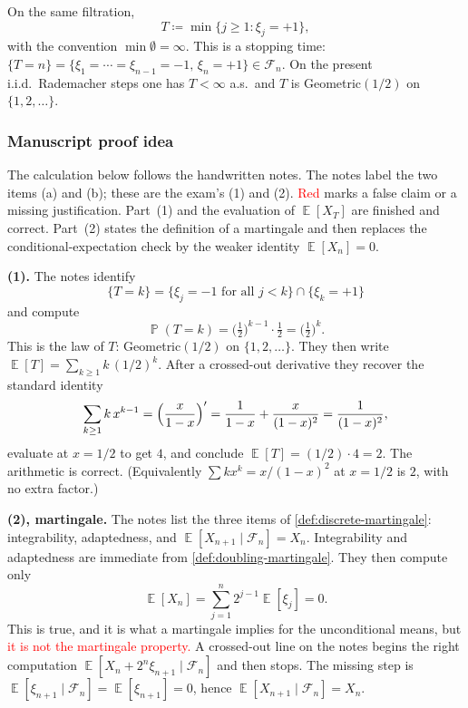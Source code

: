 \documentclass[11pt,a4paper]{article}
\newcommand{\mserr}[1]{\textcolor{red}{#1}}
\DeclareMathOperator{\E}{\mathbb{E}}
\DeclareMathOperator{\Pbb}{\mathbb{P}}
\begin{document}
\begin{definition}
\label{def:first-plus-one}
On the same filtration,
\[
T
\coloneqq
\min\{j\ge 1:\xi_j=+1\},
\]
with the convention \( \min\emptyset=\infty \). This is a stopping time: \( \{T=n\}=\{\xi_1=\cdots=\xi_{n-1}=-1,\,\xi_n=+1\}\in\mathcal{F}_n \). On the present i.i.d.\ Rademacher steps one has \( T<\infty \) a.s.\ and \( T \) is Geometric\( (1/2) \) on \( \{1,2,\dots\} \).
\end{definition}

\subsubsection{Manuscript proof idea}

The calculation below follows the handwritten notes. The notes label the two items (a) and (b); these are the exam's (1) and (2). \mserr{Red} marks a false claim or a missing justification. Part~(1) and the evaluation of \( \E[X_T] \) are finished and correct. Part~(2) states the definition of a martingale and then replaces the conditional-expectation check by the weaker identity \( \E[X_n]=0 \).

\textbf{(1).}
The notes identify
\[
\{T=k\}
=
\{\xi_j=-1\text{ for all }j<k\}
\cap
\{\xi_k=+1\}
\]
and compute
\[
\Pbb(T=k)
=
\bigl(\tfrac12\bigr)^{k-1}\cdot\tfrac12
=
\bigl(\tfrac12\bigr)^{k}.
\]
This is the law of \( T \): Geometric\( (1/2) \) on \( \{1,2,\dots\} \). They then write \( \E[T]=\sum_{k\ge 1}k\,(1/2)^{k} \). After a crossed-out derivative they recover the standard identity
\[
\sum_{k\ge 1}k\,x^{k-1}
=
\Bigl(\frac{x}{1-x}\Bigr)'
=
\frac{1}{1-x}+\frac{x}{(1-x)^{2}}
=
\frac{1}{(1-x)^{2}},
\]
evaluate at \( x=1/2 \) to get \( 4 \), and conclude \( \E[T]=(1/2)\cdot 4=2 \). The arithmetic is correct. (Equivalently \( \sum k x^{k}=x/(1-x)^{2} \) at \( x=1/2 \) is \( 2 \), with no extra factor.)

\textbf{(2), martingale.}
The notes list the three items of \cref{def:discrete-martingale}: integrability, adaptedness, and \( \E[X_{n+1}\mid\mathcal{F}_n]=X_n \). Integrability and adaptedness are immediate from \cref{def:doubling-martingale}. They then compute only
\[
\E[X_n]
=
\sum_{j=1}^{n}2^{j-1}\E[\xi_j]
=
0.
\]
This is true, and it is what a martingale implies for the unconditional means, but \mserr{it is not the martingale property.} A crossed-out line on the notes begins the right computation \( \E[X_n+2^{n}\xi_{n+1}\mid\mathcal{F}_n] \) and then stops. The missing step is \( \E[\xi_{n+1}\mid\mathcal{F}_n]=\E[\xi_{n+1}]=0 \), hence \( \E[X_{n+1}\mid\mathcal{F}_n]=X_n \).
\end{document}
